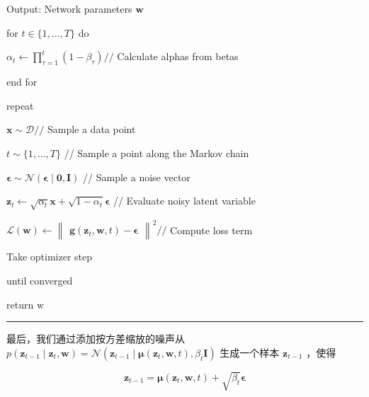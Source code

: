 \documentclass[10pt]{article}
\newcommand{\HRule}{\begin{center}\rule{0.9\linewidth}{0.2mm}\end{center}}
\begin{document}
\hspace*{1em} Output: Network parameters \(\mathbf{w}\)

\hspace*{1em} for \(t \in  \{ 1,\ldots ,T\}\) do

\hspace*{2em} \({\alpha }_{t} \leftarrow  \mathop{\prod }\limits_{{\tau  = 1}}^{t}\left( {1 - {\beta }_{\tau }}\right) //\) Calculate alphas from betas

\hspace*{1em} end for

\hspace*{1em} repeat

\hspace*{2em} \(\mathbf{x} \sim  \mathcal{D}//\) Sample a data point

\hspace*{2em} \(t \sim  \{ 1,\ldots ,T\}\) // Sample a point along the Markov chain

\hspace*{2em} \(\mathbf{\epsilon } \sim  \mathcal{N}\left( {\mathbf{\epsilon } \mid  \mathbf{0},\mathbf{I}}\right)\) // Sample a noise vector

\hspace*{2em} \({\mathbf{z}}_{t} \leftarrow  \sqrt{{\alpha }_{t}}\mathbf{x} + \sqrt{1 - {\alpha }_{t}}\mathbf{\epsilon }\) // Evaluate noisy latent variable

\hspace*{2em} \(\mathcal{L}\left( \mathbf{w}\right)  \leftarrow  {\begin{Vmatrix}\mathbf{g}\left( {\mathbf{z}}_{t},\mathbf{w},t\right)  - \mathbf{\epsilon }\end{Vmatrix}}^{2}//\) Compute loss term

\hspace*{2em} Take optimizer step

\hspace*{1em} until converged

\hspace*{1em} return \(\mathrm{w}\)

\HRule

最后，我们通过添加按方差缩放的噪声从 \(p\left( {{\mathbf{z}}_{t - 1} \mid  {\mathbf{z}}_{t},\mathbf{w}}\right)  = \mathcal{N}\left( {{\mathbf{z}}_{t - 1} \mid  \mathbf{\mu }\left( {{\mathbf{z}}_{t},\mathbf{w},t}\right) ,{\beta }_{t}\mathbf{I}}\right)\) 生成一个样本 \({\mathbf{z}}_{t - 1}\) ，使得

\[
{\mathbf{z}}_{t - 1} = \mathbf{\mu }\left( {{\mathbf{z}}_{t},\mathbf{w},t}\right)  + \sqrt{{\beta }_{t}}\mathbf{\epsilon } \tag{20.41}
\]
\end{document}
